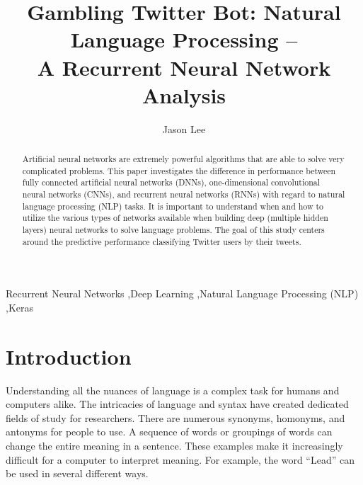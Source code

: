\documentclass[5p,authoryear]{elsarticle}
\begin{document}
\begin{frontmatter}

\title{Gambling Twitter Bot: Natural Language Processing –\\ A Recurrent Neural Network Analysis}
\author{Jason Lee}
\address{Northwestern University, SPS \\Artificial Intelligence and Deep Learning \\2019FA MSDS 458-56}


\begin{abstract}

Artificial neural networks are extremely powerful algorithms that are able to solve very complicated problems. This paper investigates the difference in performance between fully connected artificial neural networks (DNNs), one-dimensional convolutional neural networks (CNNs), and recurrent neural networks (RNNs) with regard to natural language processing (NLP) tasks. It is important to understand when and how to utilize the various types of networks available when building deep (multiple hidden layers) neural networks to solve language problems. The goal of this study centers around the predictive performance classifying Twitter users by their tweets.



\end{abstract}


\begin{keyword}
Recurrent Neural Networks \sep Deep Learning \sep Natural Language Processing (NLP) \sep Keras\end{keyword}

\end{frontmatter}



\section{Introduction}\label{introduction}

Understanding all the nuances of language is a complex task for humans and computers alike. The intricacies of language and syntax have created dedicated fields of study for researchers. There are numerous synonyms, homonyms, and antonyms for people to use. A sequence of words or groupings of words can change the entire meaning in a sentence. These examples make it increasingly difficult for a computer to interpret meaning. For example, the word “Lead” can be used in several different ways. 
\end{document}
